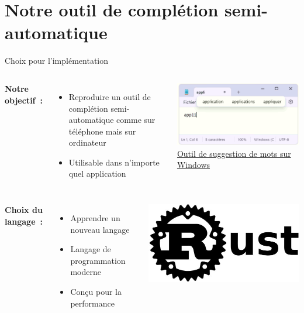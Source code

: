 \section{Notre outil de complétion semi-automatique}

\begin{frame}{Choix pour l'implémentation}
	\begin{columns}
		\textbf{Notre objectif~:}
		\begin{itemize}
			\item Reproduire un outil de complétion semi-automatique comme sur téléphone mais sur ordinateur
			\item Utilisable dans n'importe quel application
		\end{itemize}

		\begin{center}
			\includegraphics[width=\textwidth]{images/suggestion_windows.png}
			\uline{Outil de suggestion de mots sur Windows}
		\end{center}
	\end{columns}
	\vspace{0.5cm}
	\begin{columns}
		\column{0.5\textwidth}
		\textbf{Choix du langage~:}
		\begin{itemize}
			\item Apprendre un nouveau langage
			\item Langage de programmation moderne
			\item Conçu pour la performance
		\end{itemize}

		\column{0.5\textwidth}
		\includegraphics[width=\textwidth]{images/rust.jpeg}
	\end{columns}
\end{frame}


